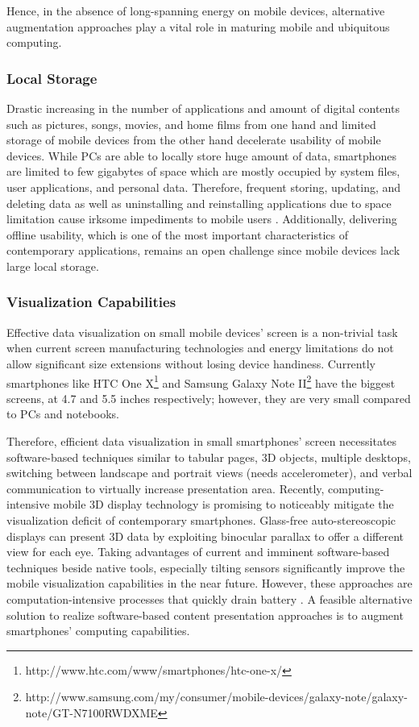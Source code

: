 \documentclass[publish]{IEEEtran}
\begin{document}
Hence, in the absence of long-spanning energy on mobile devices, alternative augmentation approaches play a vital role in maturing mobile and ubiquitous computing.
 
\subsubsection{Local Storage}
Drastic increasing in the number of applications and amount of digital contents such as pictures, songs, movies, and home films \cite{Gantz2008} from one hand and limited storage of mobile devices from the other hand decelerate usability of mobile devices. While PCs are able to locally store huge amount of data, smartphones are limited to few gigabytes of space which are mostly occupied by system files, user applications, and personal data. Therefore, frequent storing, updating, and deleting data as well as uninstalling and reinstalling applications due to space limitation cause irksome impediments to mobile users \cite{Guo2008}. Additionally, delivering offline usability, which is one of the most important characteristics of contemporary applications, remains an open challenge since mobile devices lack large local storage. 

\subsubsection{Visualization Capabilities} \label{visualization} 
Effective data visualization on small mobile devices' screen is a non-trivial task when current screen manufacturing technologies and energy limitations do not allow significant size extensions without losing device handiness. Currently smartphones like HTC One X\footnote{http://www.htc.com/www/smartphones/htc-one-x/} and Samsung Galaxy Note II\footnote{http://www.samsung.com/my/consumer/mobile-devices/galaxy-note/galaxy-note/GT-N7100RWDXME} have the biggest screens, at 4.7 and 5.5 inches respectively; however, they are very small compared to PCs and notebooks. 

Therefore, efficient data visualization in small smartphones' screen necessitates software-based techniques similar to tabular pages, 3D objects, multiple desktops, switching between landscape and portrait views (needs accelerometer), and verbal communication to virtually increase presentation area. Recently, computing-intensive mobile 3D display technology is promising to noticeably mitigate the visualization deficit of contemporary smartphones. Glass-free auto-stereoscopic displays \cite{Ortiz2011} can present 3D data by exploiting binocular parallax to offer a different view for each eye. Taking advantages of current and imminent software-based techniques beside native tools, especially tilting sensors significantly improve the mobile visualization capabilities in the near future. However, these approaches are computation-intensive processes that quickly drain battery \cite{Ortiz2011,Capin2008}. A feasible alternative solution to realize software-based content presentation approaches is to augment smartphones' computing capabilities.
\end{document}
